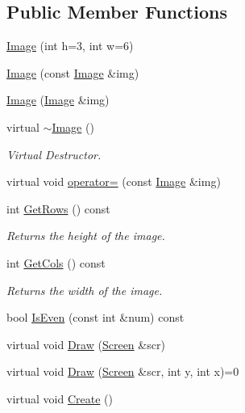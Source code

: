 \subsection*{Public Member Functions}
\begin{DoxyCompactItemize}
\item 
\hyperlink{classImage_ae2d055b04fd05ec57cf5fb927c33ff47}{Image} (int h=3, int w=6)
\item 
\hyperlink{classImage_aa44ed77d00d96d2c878b050835f828c4}{Image} (const \hyperlink{classImage}{Image} \&img)
\item 
\hyperlink{classImage_ad9a2ebd07a4f458ba24d91af0122418e}{Image} (\hyperlink{classImage}{Image} \&img)
\item 
\hypertarget{classImage_a46561cd7dcf7e203e9579737e8ace4eb}{virtual \hyperlink{classImage_a46561cd7dcf7e203e9579737e8ace4eb}{$\sim$\-Image} ()}\label{classImage_a46561cd7dcf7e203e9579737e8ace4eb}

\begin{DoxyCompactList}\small\item\em Virtual Destructor. \end{DoxyCompactList}\item 
virtual void \hyperlink{classImage_aa11e7269dc21f4b05f7c4d896b11aaa8}{operator=} (const \hyperlink{classImage}{Image} \&img)
\item 
\hypertarget{classImage_a91b5bb5c3fef2795ec9838763536ed78}{int \hyperlink{classImage_a91b5bb5c3fef2795ec9838763536ed78}{Get\-Rows} () const }\label{classImage_a91b5bb5c3fef2795ec9838763536ed78}

\begin{DoxyCompactList}\small\item\em Returns the height of the image. \end{DoxyCompactList}\item 
\hypertarget{classImage_a5377ce45ff29db084776e675b413f165}{int \hyperlink{classImage_a5377ce45ff29db084776e675b413f165}{Get\-Cols} () const }\label{classImage_a5377ce45ff29db084776e675b413f165}

\begin{DoxyCompactList}\small\item\em Returns the width of the image. \end{DoxyCompactList}\item 
bool \hyperlink{classImage_aa723637c3d64e1290dbfc67238321413}{Is\-Even} (const int \&num) const 
\item 
virtual void \hyperlink{classImage_a71cee63ad701ddbb0268e09a7b64d697}{Draw} (\hyperlink{classScreen}{Screen} \&scr)
\item 
virtual void \hyperlink{classImage_a72d145544910c3a28cbc326c009d67c1}{Draw} (\hyperlink{classScreen}{Screen} \&scr, int y, int x)=0
\item 
\hypertarget{classImage_ac497774e777c10606e8179b1f350ebef}{virtual void \hyperlink{classImage_ac497774e777c10606e8179b1f350ebef}{Create} ()}\label{classImage_ac497774e777c10606e8179b1f350ebef}


\end{DoxyCompactItemize}

